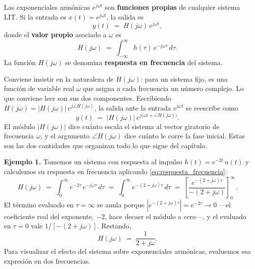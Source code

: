 \documentclass[class=book, crop=false]{standalone}
\begin{document}
\begin{resultado}
Las exponenciales armónicas $e^{j\omega t}$ son \textbf{funciones propias} de cualquier sistema LIT. Si la entrada es $x(t) = e^{j\omega t}$, la salida es
\begin{equation*}
    y(t) \;=\; H(j\omega)\,e^{j\omega t},
\end{equation*}
donde el \textbf{valor propio} asociado a $\omega$ es
\begin{equation}
    H(j\omega) \;=\; \int_{-\infty}^{\infty} h(\tau)\,e^{-j\omega\tau}\,d\tau.
    \label{eq:respuesta_frecuencia}
\end{equation}
La función $H(j\omega)$ se denomina \textbf{respuesta en frecuencia} del sistema.
\end{resultado}

Conviene insistir en la naturaleza de $H(j\omega)$: para un sistema fijo, es una función de variable real $\omega$ que asigna a cada frecuencia un número complejo. Lo que conviene leer son sus dos componentes. Escribiendo $H(j\omega) = |H(j\omega)|\,e^{j\angle H(j\omega)}$, la salida ante la entrada $e^{j\omega t}$ se reescribe como
\begin{equation*}
    y(t) \;=\; |H(j\omega)|\,e^{j\bigl(\omega t + \angle H(j\omega)\bigr)}.
\end{equation*}
El módulo $|H(j\omega)|$ dice cuánto escala el sistema al vector giratorio de frecuencia $\omega$, y el argumento $\angle H(j\omega)$ dice cuánto le corre la fase inicial. Estas son las dos cantidades que organizan todo lo que sigue del capítulo.

\medskip
\textbf{Ejemplo 1.}
Tomemos un sistema con respuesta al impulso $h(t) = e^{-2t}\,u(t)$ y calculemos su respuesta en frecuencia aplicando \eqref{eq:respuesta_frecuencia}:
\begin{equation*}
    H(j\omega) \;=\; \int_0^{\infty} e^{-2\tau}\,e^{-j\omega\tau}\,d\tau
              \;=\; \int_0^{\infty} e^{-(2 + j\omega)\tau}\,d\tau
              \;=\; \left[\frac{e^{-(2+j\omega)\tau}}{-(2+j\omega)}\right]_0^{\infty}.
\end{equation*}
El término evaluado en $\tau = \infty$ se anula porque $|e^{-(2+j\omega)\tau}| = e^{-2\tau} \to 0$ ---el coeficiente real del exponente, $-2$, hace decaer el módulo a cero---, y el evaluado en $\tau = 0$ vale $1/[-(2+j\omega)]$. Restando,
\begin{equation*}
    H(j\omega) \;=\; \frac{1}{2 + j\omega}.
\end{equation*}
Para visualizar el efecto del sistema sobre exponenciales armónicas, evaluemos esa expresión en dos frecuencias.
\end{document}
